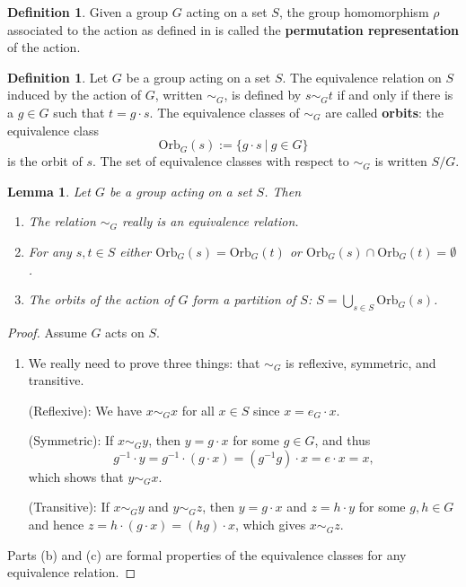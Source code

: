 \documentclass[12pt]{report}
\newtheorem{lemma}[theorem]{Lemma}
\numberwithin{equation}{section}
\numberwithin{theorem}{chapter}
\theoremstyle{definition}
\newtheorem{definition}[theorem]{Definition}
\newtheorem*{basic properties}{Basic Properties}
\newtheorem*{Important Remark}{Important Remark}
\newcommand{\df}[1]{{\bf #1}\index{#1}}
\begin{document}
\begin{definition}
	Given a group $G$ acting on a set $S$, the group homomorphism $\rho$ associated to the action as defined in  is called the \df{permutation representation} of the action.
\end{definition}










\begin{definition}
 Let $G$ be a group acting on a set $S$. The equivalence relation on $S$ induced by the action of $G$, written $\sim_G$, is defined by $s\sim_G t$ if and only if there is a $g \in G$ such that $t=g\cdot s$.  The equivalence classes of $\sim_G$ are called {\bf orbits}: the equivalence class
 $$\mathrm{Orb}_G(s) := \{g\cdot s \ | \ g\in G\}$$ 
 is the orbit of $s$. The set of equivalence classes with respect to $\sim_G$ is written $S/G$.
 \end{definition}
 
 



 
\begin{lemma}
Let $G$ be a group acting on a set $S$. Then 
\begin{enumerate}[label=(\alph*)]
\item The relation $\sim_G$ really is an equivalence relation.
\item For any $s,t \in S$ either $\mathrm{Orb}_G(s)=\mathrm{Orb}_G(t)$ or $\mathrm{Orb}_G(s)\cap \mathrm{Orb}_G(t)=\emptyset$.
\item The orbits of the action of $G$ form a partition of $S$: $S=\bigcup_{s \in S} \mathrm{Orb}_G(s)$. 
 \end{enumerate}
\end{lemma}

\begin{proof}
  Assume $G$ acts on $S$. 
  
 \begin{enumerate}[label=(\alph*)]
 \item We really need to prove three things: that $\sim_G$ is reflexive, symmetric, and transitive.
 
(Reflexive):  We have $x \sim_G x$ for all $x \in S$ since $x = e_G \cdot x$. 


(Symmetric): If $x \sim_G y$, then $y = g \cdot x$ for some $g \in G$, and thus 
$$g^{-1} \cdot y = g^{-1} \cdot (g \cdot x) = (g^{-1}g) \cdot x = e \cdot x = x,$$ 
which shows that $y \sim_G x$. 

(Transitive): If $x \sim_G y$ and $y \sim_G z$, then $y = g \cdot x$ and $z = h \cdot y$ for some $g, h \in G$ and hence $z = h \cdot (g \cdot x) = (hg) \cdot x$, which gives $x \sim_G z$.
\end{enumerate}

Parts (b) and (c) are formal properties of the equivalence classes for any equivalence relation. 
\end{proof}
\end{document}
